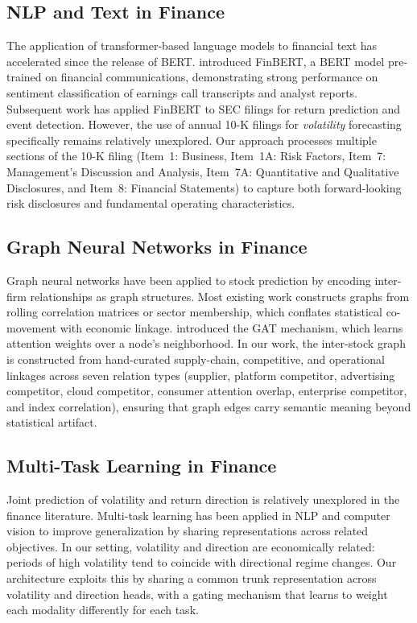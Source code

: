 \documentclass[12pt, a4paper]{article}
\begin{document}
\subsection{NLP and Text in Finance}
The application of transformer-based language models to financial text has accelerated since the release of BERT. \citet{yang2020finbert} introduced FinBERT, a BERT model pre-trained on financial communications, demonstrating strong performance on sentiment classification of earnings call transcripts and analyst reports. Subsequent work has applied FinBERT to SEC filings for return prediction and event detection. However, the use of annual 10-K filings for \textit{volatility} forecasting specifically remains relatively unexplored. Our approach processes multiple sections of the 10-K filing (Item~1: Business, Item~1A: Risk Factors, Item~7: Management's Discussion and Analysis, Item~7A: Quantitative and Qualitative Disclosures, and Item~8: Financial Statements) to capture both forward-looking risk disclosures and fundamental operating characteristics.

\subsection{Graph Neural Networks in Finance}
Graph neural networks have been applied to stock prediction by encoding inter-firm relationships as graph structures. Most existing work constructs graphs from rolling correlation matrices or sector membership, which conflates statistical co-movement with economic linkage. \citet{velivckovic2018graph} introduced the GAT mechanism, which learns attention weights over a node's neighborhood. In our work, the inter-stock graph is constructed from hand-curated supply-chain, competitive, and operational linkages across seven relation types (supplier, platform competitor, advertising competitor, cloud competitor, consumer attention overlap, enterprise competitor, and index correlation), ensuring that graph edges carry semantic meaning beyond statistical artifact.

\subsection{Multi-Task Learning in Finance}
Joint prediction of volatility and return direction is relatively unexplored in the finance literature. Multi-task learning has been applied in NLP and computer vision to improve generalization by sharing representations across related objectives. In our setting, volatility and direction are economically related: periods of high volatility tend to coincide with directional regime changes. Our architecture exploits this by sharing a common trunk representation across volatility and direction heads, with a gating mechanism that learns to weight each modality differently for each task.
\end{document}
